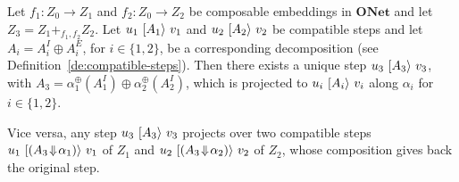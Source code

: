 \documentclass{LMCS}
\newcommand{\monSub}[2]{\ensuremath{{#1}_{#2}^\oplus}}
\newcommand{\sres}[2]{\ensuremath{({#1}\!\Downarrow\!{#2})}}
\newcommand{\comp}[1]{\ensuremath{+}_{#1}}
\newcommand{\trans}[1]{\ensuremath{\ [\/{#1}\/\rangle}\ }
\newcommand{\onet}{\ensuremath{\mathbf{ONet}}}
\begin{document}
\begin{lem}
  \label{le:compose-step}
  Let $f_1 : Z_0 \to Z_1$ and $f_2 : Z_0 \to Z_2$ be composable
  embeddings in $\onet$ and let $Z_3 = Z_1 \comp{f_1,f_2} Z_2$.  Let
  $u_1 \trans{A_1} v_1$ and $u_2 \trans{A_2} v_2$ be compatible steps
  and let $A_i = A_i^I \oplus A_i^E$, for $i \in \{1,2\}$, be a
  corresponding decomposition (see
  Definition~\ref{de:compatible-steps}).
Then there exists a unique step $u_3 \trans{A_3} v_3$, with $A_3 =
  \monSub{\alpha}{1}(A_1^I) \oplus \monSub{\alpha}{2}(A_2^I)$, which is
  projected to $u_i \trans{A_i} v_i$ along $\alpha_i$ for $i \in \{
  1,2\}$.

  Vice versa, any step $u_3 \trans{A_3} v_3$ projects over two
  compatible steps $u_1 \trans{\sres{A_3}{\alpha_1}} v_1$ of $Z_1$ and
  $u_2 \trans{\sres{A_3}{\alpha_2}} v_2$ of $Z_2$, whose composition
  gives back the original step.
\end{lem}
\end{document}
